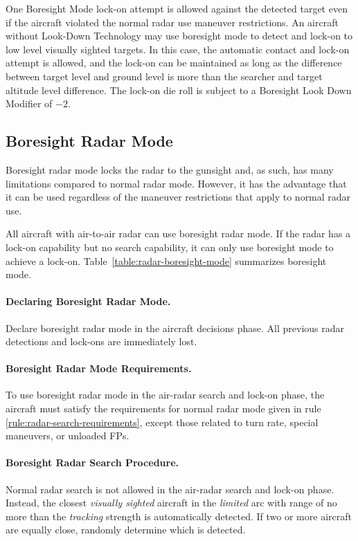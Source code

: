\begin{advancedrules}
{One Boresight Mode lock-on attempt is allowed against the detected target even if the aircraft violated the normal radar use maneuver restrictions. An aircraft without Look-Down Technology may use boresight mode to detect and lock-on to low level visually sighted targets. In this case, the automatic contact and lock-on attempt is allowed, and the lock-on can be maintained as long as the difference between target level and ground level is more than the searcher and target altitude level difference. The lock-on die roll is subject to a Boresight Look Down Modifier of $-2$. 
}{
\subsection{Boresight Radar Mode} 
\label{rule:boresight-radar-mode}

Boresight radar mode locks the radar to the gunsight and, as such, has many limitations compared to normal radar mode. However, it has the advantage that it can be used regardless of the maneuver restrictions that apply to normal radar use.

All aircraft with air-to-air radar can use boresight radar mode. If the radar has a lock-on capability but no search capability, it can only use boresight mode to achieve a lock-on. Table~\ref{table:radar-boresight-mode} summarizes boresight mode.

\paragraph{Declaring Boresight Radar Mode.} Declare boresight radar mode in the aircraft decisions phase. All previous radar detections and lock-ons are immediately lost. 

\paragraph{Boresight Radar Mode Requirements.} To use boresight radar mode in the air-radar search and lock-on phase, the aircraft must satisfy the requirements for normal radar mode given in rule \ref{rule:radar-search-requirements}, except those related to turn rate, special maneuvers, or unloaded FPs.


\paragraph{Boresight Radar Search Procedure.} Normal radar search is not allowed in the air-radar search and lock-on phase. Instead, the closest \emph{visually sighted} aircraft in the \emph{limited} arc with range of no more than the \emph{tracking} strength is automatically detected. If two or more aircraft are equally close, randomly determine which is detected. 

}
\end{advancedrules}
